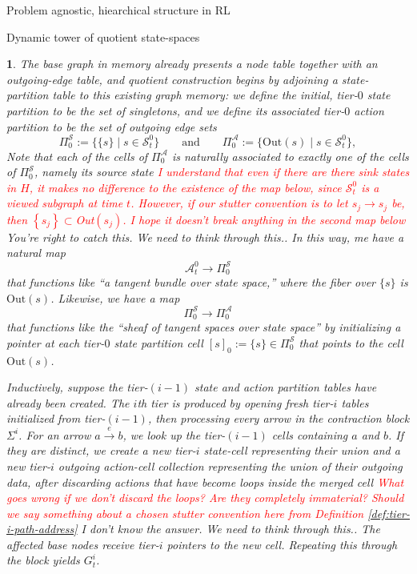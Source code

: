 \documentclass[11pt]{article}
\newtheorem{ermark}[subsubsection]{}
\begin{document}
\begin{section}{Problem agnostic, hiearchical structure in RL}
\begin{subsection}{Dynamic tower of quotient state-spaces}
\begin{ermark}
The base graph in memory already presents a node table together with an outgoing-edge table, and quotient construction begins by adjoining a state-partition table to this existing graph memory: we define the initial, {\em tier-}$0$ {\em state partition} to be the set of singletons, and we define its  associated {\em tier-}$0$ {\em action partition} to be the set of outgoing edge sets 
$$
\Pi_0^{\mathcal S}:=\bigl\{\{s\}\mid s\in\mathcal{S}_t^0\bigr\}
\qquad\text{and}\qquad
\Pi_0^{\mathcal A}:=\bigl\{\text{Out}(s)\mid s\in\mathcal{S}_t^0\bigr\},
$$
Note that each of the cells of $\Pi_0^{\mathcal A}$ is naturally associated to exactly one of the cells of $\Pi_0^{\mathcal S}$, namely its source state \textcolor{red}{I understand that even if there are there sink states in $H$, it makes no difference to the existence of the map below, since $\mathcal{S}^0_t$ is a viewed subgraph at time $t$. However, if our stutter convention is to let $s_j \longrightarrow s_j$ be, then $\left\{s_j\right\}\subset$Out$(s_j)$. I hope it doesn't break anything in the second map below} {\color{blue} You're right to catch this. We need to think through this.}. In this way, me have a natural map
$$
\mathcal{A}^{0}_{t}\longrightarrow\Pi_0^{\mathcal S}
$$
that functions like ``a tangent bundle over state space,'' where the fiber over $\{s\}$ is $\text{Out}(s)$. Likewise, we have a map
$$
\Pi_0^{\mathcal S}\longrightarrow\Pi_0^{\mathcal A}
$$
that functions like the ``sheaf of tangent spaces over state space'' by  initializing a pointer at each tier-$0$ state partition cell $[s]_{0}:=\{s\}\in\Pi_0^{\mathcal S}$ that points to the cell $\text{Out}(s)$.

Inductively, suppose the tier-$(i-1)$ state and action partition tables have already been created. The $i$th tier is produced by opening fresh tier-$i$ tables initialized from tier-$(i-1)$, then processing every arrow in the contraction block $\Sigma^i$. For an arrow $a\xrightarrow{\ e\ }b$, we look up the tier-$(i-1)$ cells containing $a$ and $b$. If they are distinct, we create a new tier-$i$ state-cell representing their union and a new tier-$i$ outgoing action-cell collection representing the union of their outgoing data, after discarding actions that have become loops inside the merged cell \textcolor{red}{What goes wrong if we don't discard the loops? Are they completely immaterial? Should we say something about a chosen stutter convention here from Definition \ref{def:tier-i-path-address}} {\color{blue} I don't know the answer. We need to think through this.}. The affected base nodes receive tier-$i$ pointers to the new cell. Repeating this through the block yields $G_t^i$.


\end{ermark}
\end{subsection}
\end{section}
\end{document}
